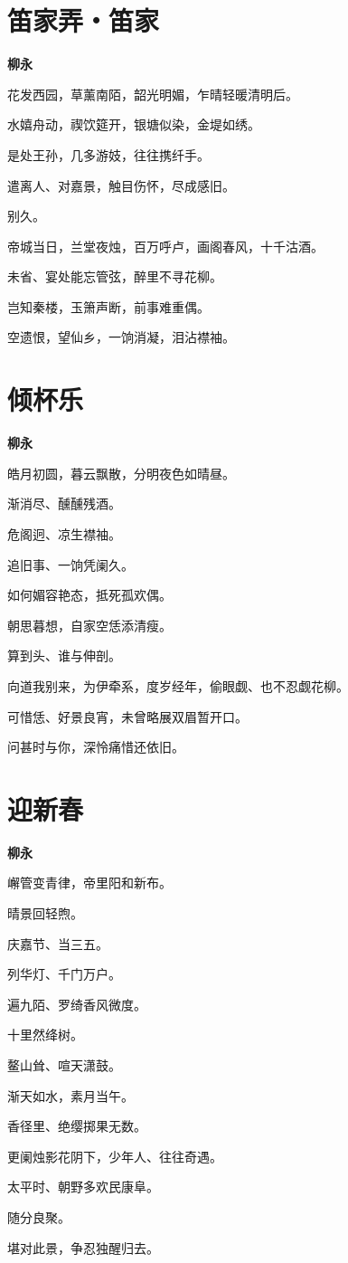 \documentclass[12pt,a4paper]{ctexbook}
\begin{document}
\section{笛家弄・笛家}
\textbf{柳永}\par\vspace{0.5em}
花发西园，草薰南陌，韶光明媚，乍晴轻暖清明后。\par
水嬉舟动，禊饮筵开，银塘似染，金堤如绣。\par
是处王孙，几多游妓，往往携纤手。\par
遣离人、对嘉景，触目伤怀，尽成感旧。\par
别久。\par
帝城当日，兰堂夜烛，百万呼卢，画阁春风，十千沽酒。\par
未省、宴处能忘管弦，醉里不寻花柳。\par
岂知秦楼，玉箫声断，前事难重偶。\par
空遗恨，望仙乡，一饷消凝，泪沾襟袖。\par

\section{倾杯乐}
\textbf{柳永}\par\vspace{0.5em}
皓月初圆，暮云飘散，分明夜色如晴昼。\par
渐消尽、醺醺残酒。\par
危阁迥、凉生襟袖。\par
追旧事、一饷凭阑久。\par
如何媚容艳态，抵死孤欢偶。\par
朝思暮想，自家空恁添清瘦。\par
算到头、谁与伸剖。\par
向道我别来，为伊牵系，度岁经年，偷眼觑、也不忍觑花柳。\par
可惜恁、好景良宵，未曾略展双眉暂开口。\par
问甚时与你，深怜痛惜还依旧。\par

\section{迎新春}
\textbf{柳永}\par\vspace{0.5em}
嶰管变青律，帝里阳和新布。\par
晴景回轻煦。\par
庆嘉节、当三五。\par
列华灯、千门万户。\par
遍九陌、罗绮香风微度。\par
十里然绛树。\par
鳌山耸、喧天潇鼓。\par
渐天如水，素月当午。\par
香径里、绝缨掷果无数。\par
更阑烛影花阴下，少年人、往往奇遇。\par
太平时、朝野多欢民康阜。\par
随分良聚。\par
堪对此景，争忍独醒归去。\par
\end{document}
